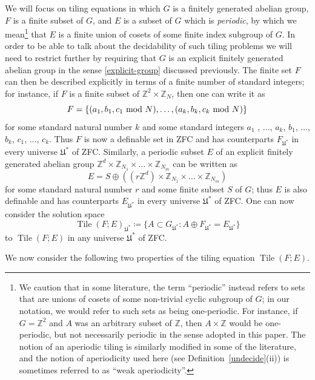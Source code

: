 \documentclass[reqno,a4paper,12pt]{amsart}
\numberwithin{equation}{section}
\numberwithin{figure}{section}
\def\Z{\mathbb{Z}}
\newcommand{\Tile}{\operatorname{Tile}}
\newcommand{\Universe}{{\mathfrak{U}}}
\theoremstyle{plain}
\theoremstyle{definition}
\newcommand{\defref}[1]{Definition~\ref{#1}}
\begin{document}
We will focus on tiling equations in which $G$ is a finitely generated abelian group, $F$ is a finite subset of $G$, and $E$ is a subset of $G$ which is \emph{periodic}, by which we mean\footnote{We caution that in some literature, the term ``periodic'' instead refers to sets that are unions of cosets of some non-trivial cyclic subgroup of $G$; in our notation, we would refer to such sets as being one-periodic.  For instance, if $G = \Z^2$ and $A$ was an arbitrary subset of $\Z$, then $A \times \Z$ would be one-periodic, but not necessarily periodic in the sense adopted in this paper.  The notion of an aperiodic tiling  is similarly modified in some of the literature, and the notion of aperiodicity used here (see \defref{undecide}(ii)) is sometimes referred to as ``weak aperiodicity''.} that $E$ is a finite union of cosets of some finite index subgroup of $G$. In order to be able to talk about the decidability of such tiling problems we will need to restrict further by requiring that $G$ is an explicit finitely generated abelian group in the sense \eqref{explicit-group} discussed previously.  The finite set $F$ can then  be described explicitly in terms of a finite number of standard integers; for instance, if $F$ is a finite subset of $\Z^2 \times \Z_N$, then one can write it as
$$ F = \{ (a_1,b_1,c_1 \hbox{ mod } N), \dots, (a_k,b_k,c_k \hbox{ mod } N) \}$$
for some standard natural number $k$ and some standard integers $a_1$ , $\dots$, $a_k$, $b_1$, $\dots$, $b_k$, $c_1$, $\dots$, $c_k$.  Thus $F$ is now a definable set in ZFC and has counterparts $F_{\Universe^*}$ in every universe $\Universe^*$ of ZFC.  Similarly, a periodic subset $E$ of an explicit finitely generated abelian group $\Z^d \times \Z_{N_1} \times \dots \times \Z_{N_m}$ can be written as
$$ E = S \oplus ((r\Z^d) \times \Z_{N_1} \times \dots \times \Z_{N_m})$$
for some standard natural number $r$ and some finite subset $S$ of $G$; thus $E$ is also definable and has counterparts $E_{\Universe^*}$ in every universe $\Universe^*$ of ZFC.  One can now consider the solution space
$$ \Tile(F;E)_{\Universe^*} \coloneqq \{ A \subset G_{\Universe^*}: A \oplus F_{\Universe^*} = E_{\Universe^*} \}$$ 
to $\Tile(F;E)$ in any universe $\Universe^*$ of ZFC.

We now consider the following two properties of the tiling equation $\Tile(F;E)$.
\end{document}
